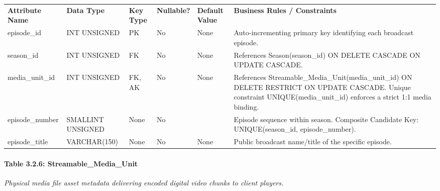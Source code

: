 {\def\LTcaptype{none} %
\begin{longtable}[]{@{}
  >{\raggedright\arraybackslash}p{}
  >{\raggedright\arraybackslash}p{}
  >{\raggedright\arraybackslash}p{}
  >{\raggedright\arraybackslash}p{}
  >{\raggedright\arraybackslash}p{}
  >{\raggedright\arraybackslash}p{}@{}}
\arrayrulecolor{black}\toprule\noalign{}
\endhead
\bottomrule\noalign{}
\endlastfoot
\textbf{Attribute Name} & \textbf{Data Type} & \textbf{Key Type} & \textbf{Nullable?} & \textbf{Default Value} & \textbf{Business Rules / Constraints} \\ \arrayrulecolor{black}\midrule
episode\_\allowbreak{}id & INT UNSIGNED & PK & No & None & Auto-incrementing primary key identifying each broadcast episode. \\ \arrayrulecolor{black!20}\midrule
season\_\allowbreak{}id & INT UNSIGNED & FK & No & None & References Season(season\_\allowbreak{}id) ON DELETE CASCADE ON UPDATE CASCADE. \\ \arrayrulecolor{black!20}\midrule
media\_\allowbreak{}unit\_\allowbreak{}id & INT UNSIGNED & FK, AK & No & None & References Streamable\_\allowbreak{}Media\_\allowbreak{}Unit(media\_\allowbreak{}unit\_\allowbreak{}id) ON DELETE RESTRICT ON UPDATE CASCADE. Unique constraint UNIQUE(media\_\allowbreak{}unit\_\allowbreak{}id) enforces a strict 1:1 media binding. \\ \arrayrulecolor{black!20}\midrule
episode\_\allowbreak{}number & SMALLINT UNSIGNED & None & No & 1 & Episode sequence within season. Composite Candidate Key: UNIQUE(season\_\allowbreak{}id, episode\_\allowbreak{}number). \\ \arrayrulecolor{black!20}\midrule
episode\_\allowbreak{}title & VARCHAR(150) & None & No & None & Public broadcast name/title of the specific episode. \\
\end{longtable}
}

\paragraph{Table 3.2.6: Streamable\_\allowbreak{}Media\_\allowbreak{}Unit}\label{table-3.2.6-streamable_media_unit}

\emph{Physical media file asset metadata delivering encoded digital video chunks to client players.}


